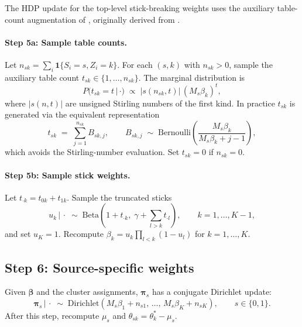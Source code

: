 \documentclass[11pt]{article}
\newcommand{\given}{\,|\,}
\newcommand{\1}{\mathbf{1}}
\begin{document}
The HDP update for the top-level stick-breaking weights uses the auxiliary table-count augmentation of \citet{teh2006hierarchical}, originally derived from \citet{antoniak1974mixtures}.

\paragraph{Step 5a: Sample table counts.} Let $n_{sk} = \sum_i \1\{S_i = s, Z_i = k\}$. For each $(s, k)$ with $n_{sk} > 0$, sample the auxiliary table count $t_{sk} \in \{1, \ldots, n_{sk}\}$. The marginal distribution is
\begin{equation}
P(t_{sk} = t \given \cdot) \;\propto\; |s(n_{sk}, t)|\, (M_s \beta_k)^t,
\end{equation}
where $|s(n, t)|$ are unsigned Stirling numbers of the first kind. In practice $t_{sk}$ is generated via the equivalent representation
\begin{equation}
t_{sk} \;=\; \sum_{j=1}^{n_{sk}} B_{sk,j}, \qquad B_{sk,j} \;\sim\; \mathrm{Bernoulli}\!\left(\frac{M_s \beta_k}{M_s \beta_k + j - 1}\right),
\end{equation}
which avoids the Stirling-number evaluation. Set $t_{sk} = 0$ if $n_{sk} = 0$.

\paragraph{Step 5b: Sample stick weights.} Let $t_{\cdot k} = t_{0k} + t_{1k}$. Sample the truncated sticks
\begin{equation}
u_k \given \cdot \;\sim\; \mathrm{Beta}\!\left(1 + t_{\cdot k},\; \gamma + \sum_{l > k} t_{\cdot l}\right), \qquad k = 1, \ldots, K - 1,
\end{equation}
and set $u_K = 1$. Recompute $\beta_k = u_k \prod_{l < k}(1 - u_l)$ for $k = 1, \ldots, K$.

\subsection{Step 6: Source-specific weights}

Given $\bm{\beta}$ and the cluster assignments, $\bm{\pi}_s$ has a conjugate Dirichlet update:
\begin{equation}
\bm{\pi}_s \given \cdot \;\sim\; \mathrm{Dirichlet}(M_s \beta_1 + n_{s1},\, \ldots,\, M_s \beta_K + n_{sK}), \qquad s \in \{0, 1\}.
\end{equation}
After this step, recompute $\mu_s$ and $\theta_{sk} = \theta_k^* - \mu_s$.
\end{document}
